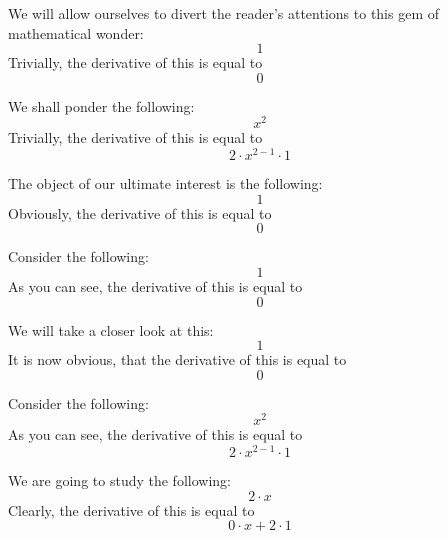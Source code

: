 \documentclass{article}
\begin{document}
We will allow ourselves to divert the reader's attentions to this gem of mathematical wonder:
\begin{equation}
1 
\end{equation}
Trivially, the derivative of this is equal to
\begin{equation}
0 
\end{equation}

We shall ponder the following:
\begin{equation}
x ^{2 } 
\end{equation}
Trivially, the derivative of this is equal to
\begin{equation}
2 \cdot x ^{2 - 1 } \cdot 1 
\end{equation}

The object of our ultimate interest is the following:
\begin{equation}
1 
\end{equation}
Obviously, the derivative of this is equal to
\begin{equation}
0 
\end{equation}

Consider the following:
\begin{equation}
1 
\end{equation}
As you can see, the derivative of this is equal to
\begin{equation}
0 
\end{equation}

We will take a closer look at this:
\begin{equation}
1 
\end{equation}
It is now obvious, that the derivative of this is equal to
\begin{equation}
0 
\end{equation}

Consider the following:
\begin{equation}
x ^{2 } 
\end{equation}
As you can see, the derivative of this is equal to
\begin{equation}
2 \cdot x ^{2 - 1 } \cdot 1 
\end{equation}

We are going to study the following:
\begin{equation}
2 \cdot x 
\end{equation}
Clearly, the derivative of this is equal to
\begin{equation}
0 \cdot x + 2 \cdot 1 
\end{equation}
\end{document}
